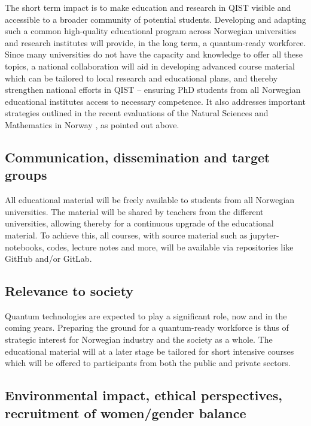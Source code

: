 \documentclass{scrreprt}
\begin{document}
The short term impact is to make education and research in QIST 
visible and accessible to a broader community of potential students. Developing and adapting such a common high-quality educational program across Norwegian universities and research institutes will provide, in the long term, a quantum-ready workforce. Since many universities do not have the capacity and knowledge to offer all these topics, a national collaboration will aid in developing advanced course material which can be tailored to local research and educational plans, and thereby strengthen national efforts in QIST -- ensuring PhD students from all Norwegian educational institutes access to necessary competence. It also addresses important strategies outlined in the recent evaluations of the Natural Sciences and Mathematics in Norway \cite{evalnat,evalmat}, as pointed out above. 

\subsection{Communication, dissemination and target groups}

All educational material will be freely available to students from all
Norwegian universities. The material will be shared by teachers from
the different universities, allowing thereby for a continuous upgrade
of the educational material.  To achieve this, all courses, with
source material such as jupyter-notebooks, codes, lecture notes and more,
will be available via repositories like GitHub and/or GitLab.


\subsection{Relevance to society}
Quantum technologies are expected to play a significant role, now and in the coming years. Preparing the ground for a quantum-ready workforce is thus of strategic interest for Norwegian industry and the society as a whole. 
The educational material will at a later stage be tailored for short intensive courses which will be offered to participants from both the public and private sectors. 

\subsection{Environmental impact, ethical perspectives, recruitment of women/gender balance }
\end{document}
